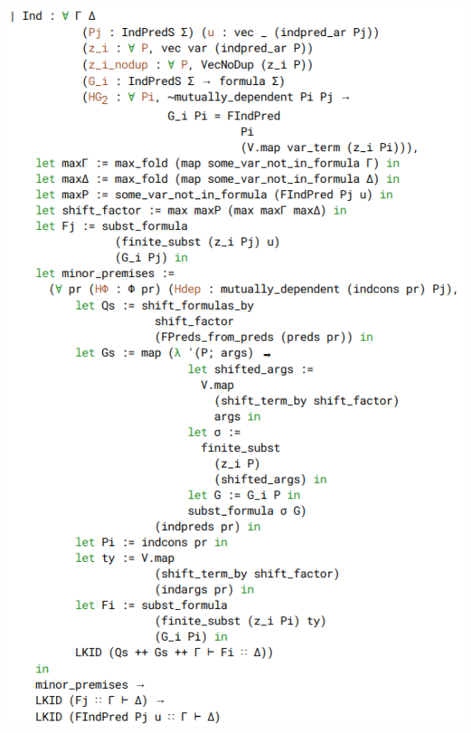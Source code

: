 \documentclass{beamer}
\begin{document}
\begin{frame}[plain]
  \includegraphics[height=\textheight]{pravilo_ind}
\end{frame}\addtocounter{framenumber}{-1}
\end{document}
